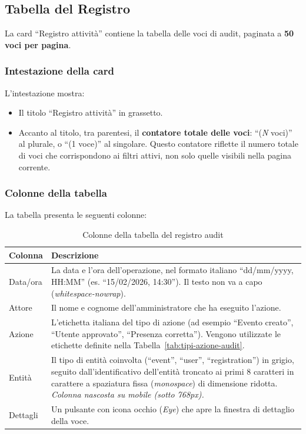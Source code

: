 \documentclass[a4paper,11pt,oneside]{book}
\begin{document}
\subsection{Tabella del Registro}
\label{sec:audit-tabella}

La card ``Registro attivit\`a'' contiene la tabella delle voci di audit, paginata a \textbf{50 voci per pagina}.

\subsubsection{Intestazione della card}

L'intestazione mostra:

\begin{itemize}[leftmargin=1.5em]
  \item Il titolo ``Registro attivit\`a'' in grassetto.
  \item Accanto al titolo, tra parentesi, il \textbf{contatore totale delle voci}: ``(\textit{N} voci)'' al plurale, o ``(1 voce)'' al singolare. Questo contatore riflette il numero totale di voci che corrispondono ai filtri attivi, non solo quelle visibili nella pagina corrente.
\end{itemize}

\subsubsection{Colonne della tabella}

La tabella presenta le seguenti colonne:

\begin{table}[htbp]
\centering
\caption{Colonne della tabella del registro audit}
\label{tab:colonne-audit}
\begin{tabularx}{\textwidth}{l X}
\toprule
\textbf{Colonna} & \textbf{Descrizione} \\
\midrule
Data/ora  & La data e l'ora dell'operazione, nel formato italiano ``dd/mm/yyyy, HH:MM'' (es. ``15/02/2026, 14:30''). Il testo non va a capo (\textit{whitespace-nowrap}). \\
Attore    & Il nome e cognome dell'amministratore che ha eseguito l'azione. \\
Azione    & L'etichetta italiana del tipo di azione (ad esempio ``Evento creato'', ``Utente approvato'', ``Presenza corretta''). Vengono utilizzate le etichette definite nella Tabella~\ref{tab:tipi-azione-audit}. \\
Entit\`a   & Il tipo di entit\`a coinvolta (``event'', ``user'', ``registration'') in grigio, seguito dall'identificativo dell'entit\`a troncato ai primi 8 caratteri in carattere a spaziatura fissa (\textit{monospace}) di dimensione ridotta. \textit{Colonna nascosta su mobile (sotto 768px).} \\
Dettagli  & Un pulsante con icona occhio (\textit{Eye}) che apre la finestra di dettaglio della voce. \\
\bottomrule
\end{tabularx}
\end{table}
\end{document}
